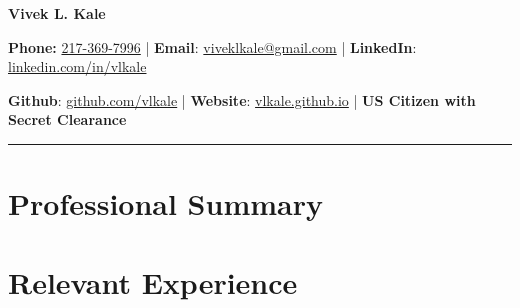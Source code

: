 \documentclass[11pt]{article}
\begin{document}
 

\begin{center}
\selectfont
    \Large \textbf{Vivek L. Kale} \\
    \normalsize

   \textbf{Phone:} \href{tel: +01 217-369-7996}{217-369-7996} | \textbf{Email}: \href{mailto:vivek.lkale@gmail.com}{viveklkale@gmail.com} | 
      \textbf{LinkedIn}: \href{http://linkedin.com/in/vlkale}{linkedin.com/in/vlkale} 

\textbf{Github}: \href{http://github.com/vlkale}{github.com/vlkale} | \textbf{Website}: \href{http://vlkale.github.io}{vlkale.github.io} | \textbf{US Citizen with Secret Clearance}
\end{center}
\noindent\rule{\linewidth}{0.4pt}

\vspace{-0.1in}
%

\section*{\selectfont Professional Summary}


\section*{\selectfont Relevant Experience}
 

\end{document}
